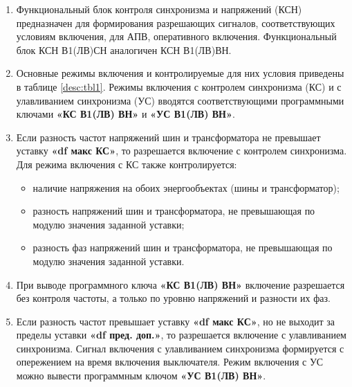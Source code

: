 \color{black}

\begin{enumerate}[label=\arabic{section}.\arabic{subsection}.\arabic{subsubsection}.\arabic*,  align=left, labelsep=4pt, leftmargin=0pt, itemindent=57pt]

\item
Функциональный блок контроля синхронизма и напряжений (КСН) предназначен для
формирования разрешающих сигналов, соответствующих условиям включения, для АПВ, оперативного
включения. Функциональный блок КСН В1(ЛВ)СН аналогичен КСН В1(ЛВ)ВН.

\item
Основные режимы включения и контролируемые для них условия приведены в таблице \ref{desc:tbl1}.
Режимы включения с контролем синхронизма (КС) и с улавливанием синхронизма (УС) вводятся
соответствующими программными ключами \textbf{«КС В1(ЛВ) ВН»} и \textbf{«УС В1(ЛВ) ВН»}.

\item
Если разность частот напряжений шин и трансформатора не превышает уставку \textbf{«df макс КС»},
то разрешается включение с контролем синхронизма. Для режима включения с КС также контролируется:
\begin{itemize}
\item наличие напряжения на обоих энергообъектах (шины и трансформатор);
\item разность напряжений шин и трансформатора, не превышающая по модулю значения заданной уставки;
\item разность фаз напряжений шин и трансформатора, не превышающая по модулю значения заданной уставки.
\end{itemize}

\item
При выводе программного ключа \textbf{«КС В1(ЛВ) ВН»} включение разрешается без контроля частоты,
а только по уровню напряжений и разности их фаз.

\item
Если разность частот превышает уставку \textbf{«df макс КС»}, но не выходит за пределы уставки \textbf{«df
пред. доп.»}, то разрешается включение с улавливанием синхронизма. Сигнал включения с
улавливанием синхронизма формируется с опережением на время включения выключателя. Режим
включения с УС можно вывести программным ключом \textbf{«УС В1(ЛВ) ВН»}.


\end{enumerate}
